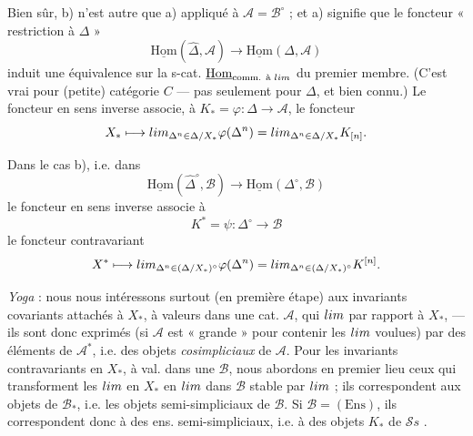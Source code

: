 \documentclass[11pt,a4paper]{article}
\begin{document}
Bien sûr, b) n'est autre que a) appliqué à $\mathcal{A} = \mathcal{B}^{\circ}$ ;
et a) signifie que le foncteur « restriction à $\Delta$ »
\[
  \underline{\mathrm{Hom}}(\widehat{\Delta}, \mathcal{A}) \longrightarrow \underline{\mathrm{Hom}}(\Delta, \mathcal{A})
\]
induit une équivalence sur la s-cat. 
$\underline{\mathrm{Hom}}_{\text{comm. à } \varinjlim}$ du premier membre. (C'est
vrai pour   (petite) catégorie $C$ --- pas
seulement pour $\Delta$, et bien connu.) Le foncteur en sens inverse associe, à
$K_{*} = \varphi : \Delta \to \mathcal{A}$, le foncteur
\[
  X_{*} \longmapsto \varinjlim_{\Delta^{n} \in \Delta/X_{*}} \varphi(\Delta^{n})
  = \varinjlim_{\Delta^{n} \in \Delta/X_{*}} K_{[n]} .
\]

Dans le cas b), i.e. dans
\[
  \underline{\mathrm{Hom}}(\widehat{\Delta}^{\circ}, \mathcal{B}) \longrightarrow \underline{\mathrm{Hom}}(\Delta^{\circ}, \mathcal{B})
\]
le foncteur en sens inverse associe à
\[
  K^{*} = \psi : \Delta^{\circ} \to \mathcal{B}
\]
le foncteur contravariant
\[
  X^{*} \longmapsto \varprojlim_{\Delta^{n} \in (\Delta/X_{*})^{\circ}} \varphi(\Delta^{n})
  = \varprojlim_{\Delta^{n} \in (\Delta/X_{*})^{\circ}} K^{[n]} .
\]

\textit{Yoga} : nous nous intéressons surtout  (en première étape) aux
invariants covariants attachés à $X_{*}$, à valeurs dans une cat. $\mathcal{A}$,
qui   $\varinjlim$ par rapport à
$X_{*}$, --- ils sont donc exprimés (si $\mathcal{A}$ est « grande » pour contenir
les $\varinjlim$ voulues) par des éléments de $\mathcal{A}^{*}$, i.e. des objets
\emph{cosimpliciaux} de $\mathcal{A}$. Pour les invariants contravariants en
$X_{*}$, à val. dans une $\mathcal{B}$,  nous abordons en premier lieu
ceux qui \struck{\ill{}} transforment les $\varinjlim$ en $X_{*}$ en $\varprojlim$
dans $\mathcal{B}$ stable par $\varprojlim$ ; ils correspondent  aux
objets de $\mathcal{B}_{*}$, i.e. les objets semi-simpliciaux de $\mathcal{B}$. Si
$\mathcal{B} = (\mathrm{Ens})$, ils correspondent donc à des ens. semi-simpliciaux,
i.e. à des objets $K_{*}$ de $\mathcal{S}s$ .
\end{document}

